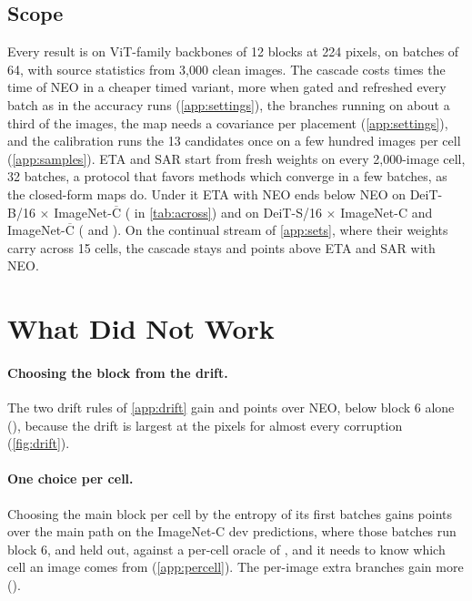 \documentclass{article}
\newcommand{\neo}{NEO}
\begin{document}
\subsection{Scope}
\label{app:scope}
Every result is on ViT-family backbones of 12 blocks at 224 pixels, on batches of 64, with source statistics from 3{,}000 clean images. The cascade costs  times the time of \neo{} in a cheaper timed variant, more when gated and refreshed every batch as in the accuracy runs (\cref{app:settings}), the branches running on about a third of the images, the map needs a covariance per placement (\cref{app:settings}), and the calibration runs the 13 candidates once on a few hundred images per cell (\cref{app:samples}). ETA and SAR start from fresh weights on every 2{,}000-image cell, 32 batches, a protocol that favors methods which converge in a few batches, as the closed-form maps do. Under it ETA with \neo{} ends below \neo{} on DeiT-B/16 $\times$ ImageNet-$\overline{\text{C}}$ ( in \cref{tab:across}) and on DeiT-S/16 $\times$ ImageNet-C and ImageNet-$\overline{\text{C}}$ ( and ). On the continual stream of \cref{app:sets}, where their weights carry across 15 cells, the cascade stays  and  points above ETA and SAR with \neo{}.

\section{What Did Not Work}
\label{app:negatives}
\paragraph{Choosing the block from the drift.} The two drift rules of \cref{app:drift} gain  and  points over \neo{}, below block 6 alone (), because the drift is largest at the pixels for almost every corruption (\cref{fig:drift}).

\paragraph{One choice per cell.} Choosing the main block per cell by the entropy of its first batches gains  points over the main path on the ImageNet-C dev predictions, where those batches run block 6, and  held out, against a per-cell oracle of , and it needs to know which cell an image comes from (\cref{app:percell}). The per-image extra branches gain more ().
\end{document}
